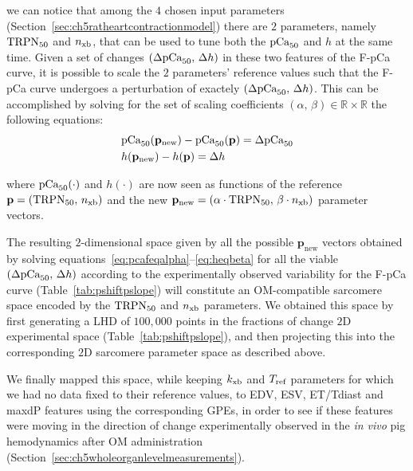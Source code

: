 \noindent
we can notice that among the $4$ chosen input parameters (Section~\ref{sec:ch5ratheartcontractionmodel}) there are $2$ parameters, namely $\textrm{TRPN}_{50}$ and $n_{\textrm{xb}}$, that can be used to tune both the $\textrm{pCa}_{50}$ and $h$ at the same time. Given a set of changes $(\Delta\textrm{pCa}_{50},\,\Delta h)$ in these two features of the F-pCa curve, it is possible to scale the $2$ parameters' reference values such that the F-pCa curve undergoes a perturbation of exactely $(\Delta\textrm{pCa}_{50},\,\Delta h)$. This can be accomplished by solving for the set of scaling coefficients $(\alpha,\,\beta)\in\mathbb{R}\times\mathbb{R}$ the following equations:
%
\begin{align}
    & \textrm{pCa}_{50}(\mathbf{p}_{\textrm{new}}) - \textrm{pCa}_{50}(\mathbf{p}) = \Delta\textrm{pCa}_{50} \label{eq:pcafeqalpha} \\
    & h(\mathbf{p}_{\textrm{new}}) - h(\mathbf{p}) = \Delta h \label{eq:heqbeta}
\end{align}

\vspace{0.2cm}\noindent
where $\textrm{pCa}_{50}(\cdot)$ and $h(\cdot)$ are now seen as functions of the reference $\mathbf{p}=(\textrm{TRPN}_{50},\,n_{\textrm{xb}})$ and the new $\mathbf{p}_{\textrm{new}}=(\alpha\cdot\textrm{TRPN}_{50},\,\beta\cdot n_{\textrm{xb}})$ parameter vectors.

\vspace{0.2cm}
The resulting $2$-dimensional space given by all the possible $\mathbf{p}_{\textrm{new}}$ vectors obtained by solving equations~\ref{eq:pcafeqalpha}--\ref{eq:heqbeta} for all the viable $(\Delta\textrm{pCa}_{50},\,\Delta h)$ according to the experimentally observed variability for the F-pCa curve (Table~\ref{tab:pshiftpslope}) will constitute an OM-compatible sarcomere space encoded by the $\textrm{TRPN}_{50}$ and $n_{\textrm{xb}}$ parameters. We obtained this space by first generating a LHD of $100,000$ points in the fractions of change $2$D experimental space (Table~\ref{tab:pshiftpslope}), and then projecting this into the corresponding $2$D sarcomere parameter space as described above.

\vspace{0.2cm}
We finally mapped this space, while keeping $k_{\textrm{xb}}$ and $T_{\textrm{ref}}$ parameters for which we had no data fixed to their reference values, to EDV, ESV, ET/Tdiast and maxdP features using the corresponding GPEs, in order to see if these features were moving in the direction of change experimentally observed in the \textit{in vivo} pig hemodynamics after OM administration (Section~\ref{sec:ch5wholeorganlevelmeasurements}).


%
%
%
